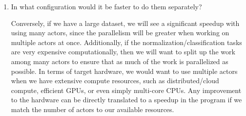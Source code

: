 \documentclass{article}
\begin{document}
\begin{enumerate}
\begin{enumerate}
        \item In what configuration would it be faster to do them separately?
        
        Conversely, if we have a large dataset, we will see a significant speedup with using many actors, since the parallelism will be greater when working on multiple actors at once. Additionally, if the normalization/classification tasks are very expensive computationally, then we will want to split up the work among many actors to ensure that as much of the work is parallelized as possible. In terms of target hardware, we would want to use multiple actors when we have extensive compute resources, such as distributed/cloud compute, efficient GPUs, or even simply multi-core CPUs. Any improvement to the hardware can be directly translated to a speedup in the program if we match the number of actors to our available resources.
    \end{enumerate}
\end{enumerate}
\end{document}
